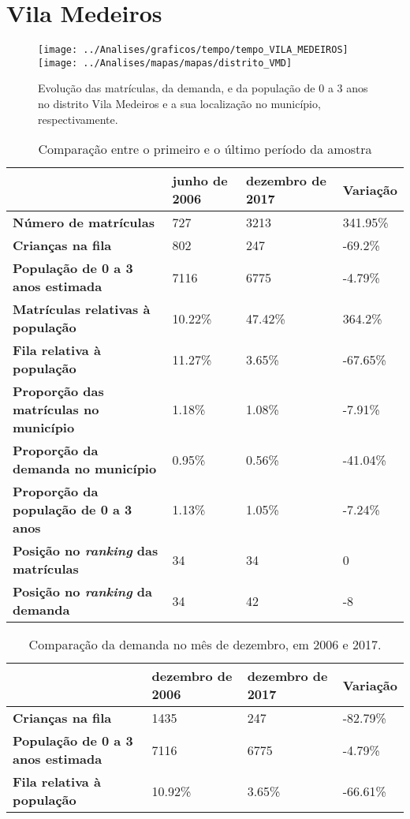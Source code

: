 \section{Vila Medeiros}
\begin{figure}[H]
	\centering
	\texttt{[image: ../Analises/graficos/tempo/tempo\_VILA\_MEDEIROS]}
	\texttt{[image: ../Analises/mapas/mapas/distrito\_VMD]}
	\caption{Evolução das matrículas, da demanda, e da população de 0 a 3 anos no distrito Vila Medeiros e a sua localização no município, respectivamente.}
\end{figure}
\begin{table}[H]
	\begin{tabular}{|l|l|l|l|}
		\hline
		\textbf{}                                      & \textbf{junho de 2006}       & \textbf{dezembro de 2017}    & \textbf{Variação} \\ \hline
		\textbf{Número de matrículas}                  & 727 & 3213 & 341.95\% \\ \hline
		\textbf{Crianças na fila}                      & 802 & 247 & -69.2\% \\ \hline
		\textbf{População de 0 a 3 anos estimada}      & 7116 & 6775 & -4.79\% \\ \hline
		\textbf{Matrículas relativas à população}      & 10.22\% & 47.42\% & 364.2\% \\ \hline
		\textbf{Fila relativa à população}             & 11.27\% & 3.65\% & -67.65\% \\ \hline
		\textbf{Proporção das matrículas no município} & 1.18\% & 1.08\% & -7.91\% \\ \hline
		\textbf{Proporção da demanda no município}     & 0.95\% & 0.56\% & -41.04\% \\ \hline
		\textbf{Proporção da população de 0 a 3 anos}  & 1.13\% & 1.05\% & -7.24\% \\ \hline
		\textbf{Posição no \textit{ranking} das matrículas}     & 34 & 34 & 0 \\ \hline
		\textbf{Posição no \textit{ranking} da demanda}         & 34 & 42 & -8 \\ \hline
	\end{tabular}
	\caption{Comparação entre o primeiro e o último período da amostra}
\end{table}
\begin{table}[H]
	\begin{tabular}{|l|l|l|l|}
		\hline
		\textbf{}                                 & \textbf{dezembro de 2006} & \textbf{dezembro de 2017} & \textbf{Variação} \\ \hline
		\textbf{Crianças na fila}                      & 1435 & 247 & -82.79\% \\ \hline
		\textbf{População de 0 a 3 anos estimada}      & 7116 & 6775 & -4.79\% \\ \hline
		\textbf{Fila relativa à população}             & 10.92\% & 3.65\% & -66.61\% \\ \hline
	\end{tabular}
	\caption{Comparação da demanda no mês de dezembro, em 2006 e 2017.}
\end{table}

